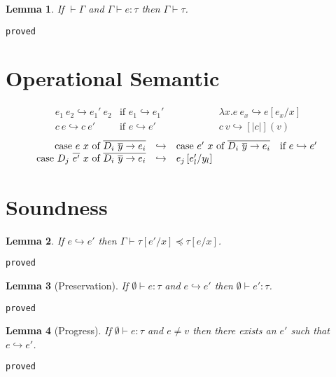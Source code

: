 \documentclass[10pt,a4paper]{article}
\newtheorem{lemma}{Lemma}
\newcommand\showproof[1]{\texttt{proved}}
\newcommand\efun[2]{\ensuremath{\lambda #1 . #2}}
\newcommand\eapp[2]{\ensuremath{#1 \ #2}}
\newcommand\edata[2]{\ensuremath{#1 \ #2}}
\newcommand\ecase[5]{\ensuremath{\text{case}\ #1\ #2\ \text{of}\ \overline{\edata{#3}{#4} \rightarrow #5}}}
\newcommand\sub[2]{\ensuremath{\left[ #2 / #1 \right]}}
\newcommand\eval[2]{\ensuremath{#1 \hookrightarrow #2}}
\newcommand\hastype[3]{\ensuremath{#1 \vdash #2 \colon #3}}
\newcommand\iswellformed[2]{\ensuremath{#1 \vdash #2}}
\newcommand\issubtype[3]{\ensuremath{#1 \vdash #2 \preceq #3}}
\begin{document}
\begin{lemma}\label{lemma:wellformed}
If \iswellformed{}{\Gamma} and \hastype{\Gamma}{e}{\tau} then \iswellformed{\Gamma}{\tau}.
\end{lemma}
\showproof{
	\begin{proof}
	
	\end{proof}
}

\section*{Operational Semantic}

$$
\begin{array}{lllll}
\eval{\eapp{e_1}{e_2}}{\eapp{e_1'}{e_2}} & \text{if } \eval{e_1}{e_1'}&\qquad\qquad&
\eval{\eapp{\efun{x}{e}}{e_x}}{e\sub{x}{e_x}} &\\
\eval{\eapp{c}{e}}{\eapp{c}{e'}} & \text{if } \eval{e}{e'} &\qquad\qquad&
\eval{\eapp{c}{v}}{[|c|](v)} &
\end{array}
$$
$$
\begin{array}{rllll}
\eval{\ecase{e}{x}{D_i}{\overline{y}}{e_i}&}
	 {&\ecase{e'}{x}{D_i}{\overline{y}}{e_i}} & \text{if } \eval{e}{e'} &\\
\eval	{\ecase{\eapp{D_j}{\overline{e'}}}{x}{D_i}{\overline{y}}{e_i}&}
		{&e_j\sub{y_l}{e'_l}} &
\end{array}
$$

\section*{Soundness}
\begin{lemma}\label{lemma:eval}
If \eval{e}{e'} then \issubtype{\Gamma}{\tau\sub{x}{e'}}{\tau\sub{x}{e}}.
\end{lemma}
\showproof{
	\begin{proof}
	
	\end{proof}
}

\begin{lemma}[Preservation]\label{lemma:preservation}
If \hastype{\emptyset}{e}{\tau} and \eval{e}{e'} then \hastype{\emptyset}{e'}{\tau}.
\end{lemma}
\showproof{
	\begin{proof}
	
	\end{proof}
}
\begin{lemma}[Progress]\label{lemma:progress}
If \hastype{\emptyset}{e}{\tau} and $e \neq v$ then there exists an $e'$ such that \eval{e}{e'}.
\end{lemma}
\showproof{
	\begin{proof}
	
	\end{proof}
}
\end{document}
